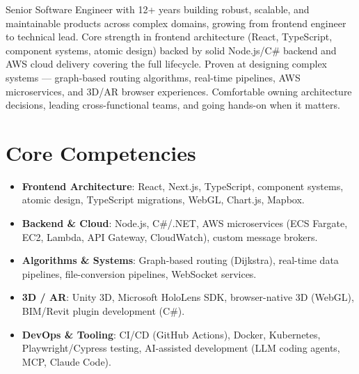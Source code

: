 \documentclass[11pt,a4paper,sans]{moderncv}
\begin{document}
\makecvtitle


\vspace{6pt}
\small{Senior Software Engineer with 12+ years building robust, scalable, and maintainable products across complex domains, growing from frontend engineer to technical lead. Core strength in frontend architecture (React, TypeScript, component systems, atomic design) backed by solid Node.js/C\# backend and AWS cloud delivery covering the full lifecycle. Proven at designing complex systems — graph-based routing algorithms, real-time pipelines, AWS microservices, and 3D/AR browser experiences. Comfortable owning architecture decisions, leading cross-functional teams, and going hands-on when it matters.}


\section{Core Competencies}
\vspace{1pt}
\begin{itemize}

\item \textbf{Frontend Architecture}: React, Next.js, TypeScript, component systems, atomic design, TypeScript migrations, WebGL, Chart.js, Mapbox.

\item \textbf{Backend \& Cloud}: Node.js, C\#/.NET, AWS microservices (ECS Fargate, EC2, Lambda, API Gateway, CloudWatch), custom message brokers.

\item \textbf{Algorithms \& Systems}: Graph-based routing (Dijkstra), real-time data pipelines, file-conversion pipelines, WebSocket services.

\item \textbf{3D / AR}: Unity 3D, Microsoft HoloLens SDK, browser-native 3D (WebGL), BIM/Revit plugin development (C\#).

\item \textbf{DevOps \& Tooling}: CI/CD (GitHub Actions), Docker, Kubernetes, Playwright/Cypress testing, AI-assisted development (LLM coding agents, MCP, Claude Code).

\end{itemize}
\end{document}

